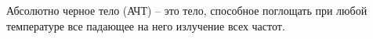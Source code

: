 \documentclass[__minimum__.tex]{subfiles}
\begin{document}
\begin{comment}
+ 1) Закон Киргофа
+ 2) Закон смещения Вина
+ 3) Закон Стефана Больцмана
+ 4) Формула Рэлея-Джинса
+ 5) Формула Планка
+ 6) Соотношение неопределенностей Гейзенберга
+ 7) Постулаты квантовой механики
+ 8) Коммутатор
+ 9) Эрмитов оператор
+ 10) Постулат о вещественных велечинах
+ 11) Постулат об измерениях
+ 12) Наблюдаемый оператор
+ 13) Равенство Парсевалля
+ 14) Квантомеханические средние
+ 15) Временное и стационарное уравнения Шредингера
+ 16) Вектор плотности тока вероятности
+ 17) Теорема Эренфеста
+ 18) Дуальное пространство
+ 19) Коммутационные соотношения
+ 20) Кванто-механический гармонический осцилятор
+ 21) Постулаты Бора
+ 22) Полный и собственный момент импульса
23) Матрицы Паули
\end{comment}


\begin{definition}
  Абсолютно черное тело (АЧТ) -- это тело, способное поглощать при любой температуре все падающее на него излучение всех частот.
\end{definition}
\end{document}
